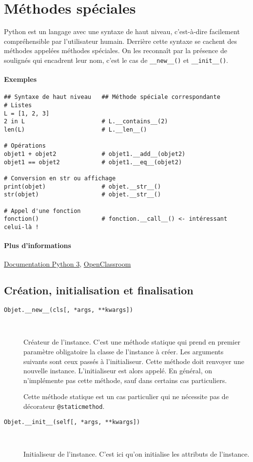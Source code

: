 \section{Méthodes spéciales}
Python est un langage avec une syntaxe de haut niveau, c'est-à-dire facilement compréhensible par l'utilisateur humain. Derrière cette syntaxe se cachent des méthodes appelées méthodes spéciales. On les reconnaît par la présence de soulignés qui encadrent leur nom, c'est le cas de \texttt{__new__()} et \texttt{__init__()}.

\paragraph{Exemples}
\begin{verbatim}
## Syntaxe de haut niveau   ## Méthode spéciale correspondante
# Listes
L = [1, 2, 3]
2 in L                      # L.__contains__(2)
len(L)                      # L.__len__()

# Opérations
objet1 + objet2             # objet1.__add__(objet2)
objet1 == objet2            # objet1.__eq__(objet2)

# Conversion en str ou affichage
print(objet)                # objet.__str__()
str(objet)                  # objet.__str__()

# Appel d'une fonction
fonction()                  # fonction.__call__() <- intéressant celui-là !
\end{verbatim}

\paragraph{Plus d'informations} \href{https://docs.python.org/3/reference/datamodel.html#specialnames}{Documentation Python 3}, \href{https://openclassrooms.com/courses/apprenez-a-programmer-en-python/les-methodes-speciales-1}{OpenClassroom}


\subsection{Création, initialisation et finalisation}
\begin{description}
    \item[\texttt{Objet.__new__(cls[, *args, **kwargs])}]~

    Créateur de l'instance. C'est une méthode statique qui prend en premier paramètre obligatoire la classe de l'instance à créer. Les arguments suivants sont ceux passés à l'initialiseur. Cette méthode doit renvoyer une nouvelle instance. L'initialiseur est alors appelé. En général, on n'implémente pas cette méthode, sauf dans certains cas particuliers.\medskip

    Cette méthode statique est un cas particulier qui ne nécessite pas de décorateur \texttt{@staticmethod}.

    \item[\texttt{Objet.__init__(self[, *args, **kwargs])}]~

    Initialiseur de l'instance. C'est ici qu'on initialise les attributs de l'instance.
\end{description}

